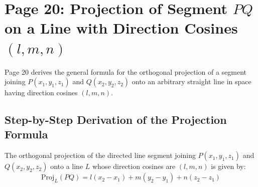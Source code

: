 \section{Page 20: Projection of Segment $PQ$ on a Line with Direction Cosines $(l,m,n)$}
\label{sec:page20}

\begin{conceptbox}
Page 20 derives the general formula for the orthogonal projection of a segment joining $P(x_1, y_1, z_1)$ and $Q(x_2, y_2, z_2)$ onto an arbitrary straight line in space having direction cosines $(l, m, n)$.
\end{conceptbox}

\subsection{Step-by-Step Derivation of the Projection Formula}
\begin{theorembox}
The orthogonal projection of the directed line segment joining $P(x_1, y_1, z_1)$ and $Q(x_2, y_2, z_2)$ onto a line $L$ whose direction cosines are $(l, m, n)$ is given by:
\begin{equation}
    \boxed{\text{Proj}_L(PQ) = l(x_2 - x_1) + m(y_2 - y_1) + n(z_2 - z_1)}
\end{equation}
\end{theorembox}


